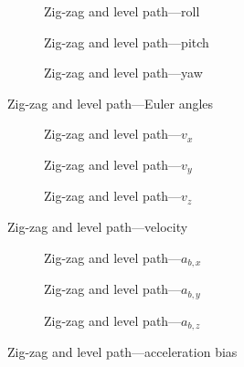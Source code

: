 \begin{figure}[H]
    \centering
    \begin{subfigure}{0.3\textwidth}
        
        \caption{Zig-zag and level path---roll}
    \end{subfigure}
    \hfill
    \begin{subfigure}{0.3\textwidth}
        
        \caption{Zig-zag and level path---pitch}
    \end{subfigure}
    \hfill
    \begin{subfigure}{0.3\textwidth}
        
        \caption{Zig-zag and level path---yaw}
    \end{subfigure}
    \caption{Zig-zag and level path---Euler angles}\label{fig:zig-zag-level-euler}
\end{figure}

\begin{figure}[H]
    \centering
    \begin{subfigure}{0.3\textwidth}
        
        \caption{Zig-zag and level path---$v_x$}
    \end{subfigure}
    \hfill
    \begin{subfigure}{0.3\textwidth}
        
        \caption{Zig-zag and level path---$v_y$}
    \end{subfigure}
    \hfill
    \begin{subfigure}{0.3\textwidth}
        
        \caption{Zig-zag and level path---$v_z$}
    \end{subfigure}
    \caption{Zig-zag and level path---velocity}\label{fig:zig-zag-level-vel}
\end{figure}

\begin{figure}[H]
    \centering
    \begin{subfigure}{0.3\textwidth}
        
        \caption{Zig-zag and level path---$a_{b,x}$}
    \end{subfigure}
    \hfill
    \begin{subfigure}{0.3\textwidth}
        
        \caption{Zig-zag and level path---$a_{b,y}$}
    \end{subfigure}
    \hfill
    \begin{subfigure}{0.3\textwidth}
        
        \caption{Zig-zag and level path---$a_{b,z}$}
    \end{subfigure}
    \caption{Zig-zag and level path---acceleration bias}\label{fig:zig-zag-level-abias}
\end{figure}

